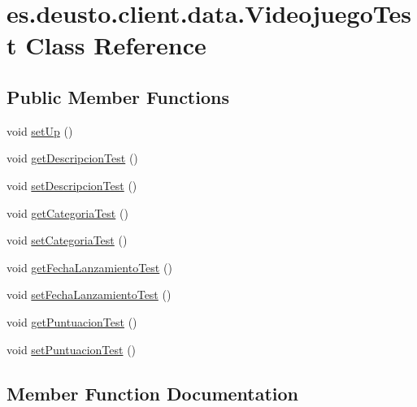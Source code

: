 \hypertarget{classes_1_1deusto_1_1client_1_1data_1_1_videojuego_test}{}\section{es.\+deusto.\+client.\+data.\+Videojuego\+Test Class Reference}
\label{classes_1_1deusto_1_1client_1_1data_1_1_videojuego_test}
\subsection*{Public Member Functions}
\begin{DoxyCompactItemize}
\item 
void \mbox{\hyperlink{classes_1_1deusto_1_1client_1_1data_1_1_videojuego_test_afe20cac61bf93a60aa7c73cb28aa1df7}{set\+Up}} ()
\item 
void \mbox{\hyperlink{classes_1_1deusto_1_1client_1_1data_1_1_videojuego_test_ae07772ae21b40339af408dac772a4927}{get\+Descripcion\+Test}} ()
\item 
void \mbox{\hyperlink{classes_1_1deusto_1_1client_1_1data_1_1_videojuego_test_a38b2d5354d3e9067f201ab916ac0e191}{set\+Descripcion\+Test}} ()
\item 
void \mbox{\hyperlink{classes_1_1deusto_1_1client_1_1data_1_1_videojuego_test_acc4891e27bc0bf1e24b2367f519a6cc6}{get\+Categoria\+Test}} ()
\item 
void \mbox{\hyperlink{classes_1_1deusto_1_1client_1_1data_1_1_videojuego_test_a214657582e208c3bca17be47b83b0159}{set\+Categoria\+Test}} ()
\item 
void \mbox{\hyperlink{classes_1_1deusto_1_1client_1_1data_1_1_videojuego_test_a6d7ab2f077992362f90dd8b1f04d28ea}{get\+Fecha\+Lanzamiento\+Test}} ()
\item 
void \mbox{\hyperlink{classes_1_1deusto_1_1client_1_1data_1_1_videojuego_test_ac321f77df936686959695cac3710f534}{set\+Fecha\+Lanzamiento\+Test}} ()
\item 
void \mbox{\hyperlink{classes_1_1deusto_1_1client_1_1data_1_1_videojuego_test_a52b157605087d78df063a7b3bc4358b0}{get\+Puntuacion\+Test}} ()
\item 
void \mbox{\hyperlink{classes_1_1deusto_1_1client_1_1data_1_1_videojuego_test_a75e2fffd21c969b532d80d4fe2ba836d}{set\+Puntuacion\+Test}} ()
\end{DoxyCompactItemize}


\subsection{Member Function Documentation}
\mbox{\label{classes_1_1deusto_1_1client_1_1data_1_1_videojuego_test_acc4891e27bc0bf1e24b2367f519a6cc6}} 
